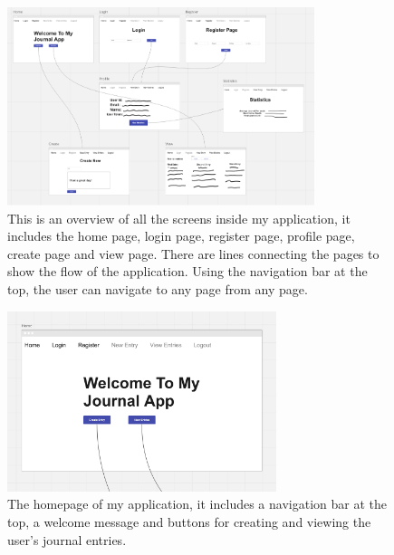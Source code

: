 \newpage
\begin{figure}[H]
    \centering
    \includegraphics[width=0.8\textwidth]{Assets/all_pages.png}
    \caption{This is an overview of all the screens inside my application, it includes the home page, login page, register page, profile page, create page and view page. There are lines connecting the pages to show the flow of the application. Using the navigation bar at the top, the user can navigate to any page from any page.}
\end{figure}


\begin{figure}[H]
    \centering
    \includegraphics[width=0.7\textwidth]{Assets/home_page.png}
    \caption{The homepage of my application, it includes a navigation bar at the top, a welcome message and buttons for creating and viewing the user's journal entries.}
\end{figure}

